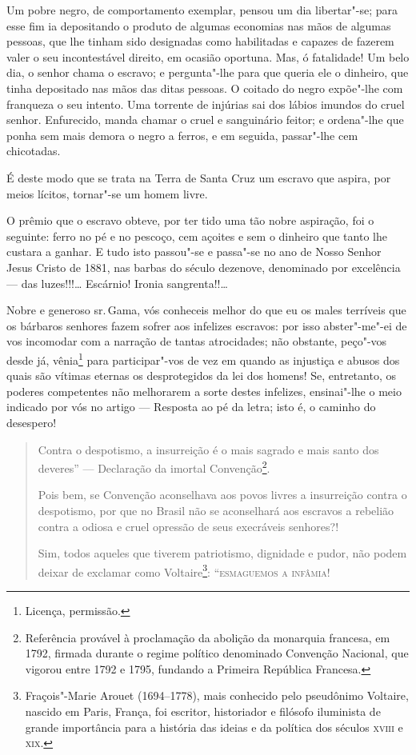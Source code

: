 Um pobre negro, de comportamento exemplar, pensou um dia libertar"-se;
para esse fim ia depositando o produto de algumas economias nas mãos de
algumas pessoas, que lhe tinham sido designadas como habilitadas e
capazes de fazerem valer o seu incontestável direito, em ocasião
oportuna. Mas, ó fatalidade! Um belo dia, o senhor chama o escravo; e
pergunta"-lhe para que queria ele o dinheiro, que tinha depositado nas
mãos das ditas pessoas. O coitado do negro expõe"-lhe com franqueza o seu
intento. Uma torrente de injúrias sai dos lábios imundos do cruel
senhor. Enfurecido, manda chamar o cruel e sanguinário feitor; e
ordena"-lhe que ponha sem mais demora o negro a ferros, e em seguida,
passar"-lhe cem chicotadas.

É deste modo que se trata na Terra de Santa Cruz um escravo que aspira,
por meios lícitos, tornar"-se um homem livre.

O prêmio que o escravo obteve, por ter tido uma tão nobre aspiração, foi
o seguinte: ferro no pé e no pescoço, cem açoites e sem o dinheiro que
tanto lhe custara a ganhar. E tudo isto passou"-se e passa"-se no ano de
Nosso Senhor Jesus Cristo de 1881, nas barbas do século dezenove,
denominado por excelência --- das luzes!!!\ldots{} Escárnio! Ironia
sangrenta!!\ldots{}

Nobre e generoso sr.\,Gama, vós conheceis melhor do que eu os males
terríveis que os bárbaros senhores fazem sofrer aos infelizes escravos:
por isso abster"-me"-ei de vos incomodar com a narração de tantas
atrocidades; não obstante, peço"-vos desde já, vênia\footnote{Licença,
  permissão.} para participar"-vos de vez em quando as injustiça e abusos
dos quais são vítimas eternas os desprotegidos da lei dos homens! Se,
entretanto, os poderes competentes não melhorarem a sorte destes
infelizes, ensinai"-lhe o meio indicado por vós no artigo --- Resposta
ao pé da letra; isto é, o caminho do desespero!

\begin{quote}
Contra o despotismo, a insurreição é o mais sagrado e mais santo dos
deveres'' --- Declaração da imortal Convenção\footnote{Referência
  provável à proclamação da abolição da monarquia francesa, em 1792,
  firmada durante o regime político denominado Convenção Nacional, que
  vigorou entre 1792 e 1795, fundando a Primeira República Francesa.}.

Pois bem, se Convenção aconselhava aos povos livres a insurreição contra
o despotismo, por que no Brasil não se aconselhará aos escravos a
rebelião contra a odiosa e cruel opressão de seus execráveis senhores?!

Sim, todos aqueles que tiverem patriotismo, dignidade e pudor, não podem
deixar de exclamar como Voltaire\footnote{Fraçois"-Marie Arouet
  (1694--1778), mais conhecido pelo pseudônimo Voltaire, nascido em
  Paris, França, foi escritor, historiador e filósofo iluminista de
  grande importância para a história das ideias e da política dos
  séculos \textsc{xviii} e \textsc{xix}.}:
``\textsc{esmaguemos a infâmia}!
\end{quote}

